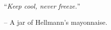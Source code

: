 \chapter*{}
\vspace*{0.2\textheight}
\begin{center}
\noindent\enquote{\itshape Keep cool, never freeze.}\hspace{1.5cm} \bigbreak

\hspace{1.5cm} -- A jar of Hellmann's\textsuperscript{\textregistered} mayonnaise.
\end{center}
